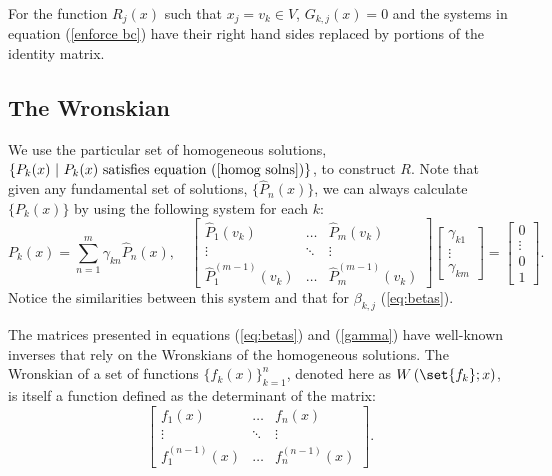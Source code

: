 \documentclass{article}
\begin{document}
For the function $R_j(x)$ such that $x_j = v_k \in V$, $G_{k,j}(x) = 0$ and the systems in equation (\ref{enforce bc}) have their right hand sides replaced by portions of the identity matrix.

\subsection{The Wronskian}

We use the particular set of homogeneous solutions, $\{ P_k(x) \ | \ P_k(x) \ \text{satisfies equation} \ (\ref{homog solns}) \}$, to construct $R$.
Note that given any fundamental set of solutions, $\{ \hat{P}_n(x) \}$, we can always calculate $\{ P_k(x) \}$ by using the following system for each $k$:
\begin{equation} \label{gamma}
P_k(x) = \sum_{n=1}^m \gamma_{kn} \hat{P}_n(x), \quad 
\begin{bmatrix} \hat{P}_1(v_k) & \dots & \hat{P}_m(v_k)
\\ \vdots & \ddots & \vdots
\\ \hat{P}_1^{(m-1)}(v_k) & \dots & \hat{P}_m^{(m-1)}(v_k) \end{bmatrix}
\begin{bmatrix} \gamma_{k1} \\ \vdots \\ \gamma_{km} \end{bmatrix} =
\begin{bmatrix} 0 \\ \vdots \\ 0 \\ 1 \end{bmatrix} .
\end{equation}
Notice the similarities between this system and that for $\beta_{k,j}$ (\ref{eq:betas}).

The matrices presented in equations (\ref{eq:betas}) and (\ref{gamma}) have well-known inverses that rely on the Wronskians of the homogeneous solutions.
The Wronskian of a set of functions $\{ f_k(x) \}_{k=1}^n$, denoted here as $\W{\set{f_k}}{x}$, is itself a function defined as the determinant of the matrix:
\begin{equation}
\begin{bmatrix} f_1(x) & \dots & f_n(x) \\ \vdots & \ddots & \vdots \\ f^{(n-1)}_1(x) & \dots & f_n^{(n-1)}(x) \end{bmatrix} .
\end{equation}
\end{document}

